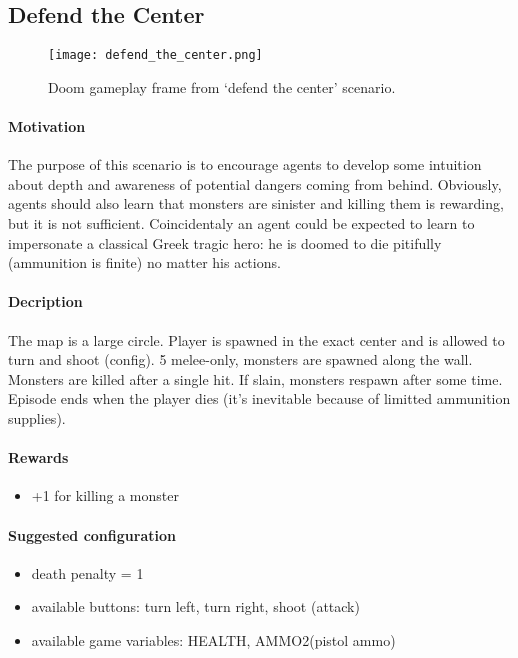 	\subsection{Defend the Center}\label{subsec:defend_the_center}
		\begin{figure}
			\centering
			\texttt{[image: defend\_the\_center.png]}
			\caption{Doom gameplay frame from `defend the center' scenario.}\label{fig:defend_the_center}
		\end{figure}
		\paragraph{Motivation} 
			The purpose of this scenario is to encourage agents to develop some intuition about depth and awareness of potential dangers coming from behind. Obviously, agents should also learn that monsters are sinister and killing them is rewarding, but it is not sufficient. Coincidentaly an agent could be expected to learn to impersonate a classical Greek tragic hero: he is doomed to die pitifully (ammunition is finite) no matter his actions.

		\paragraph{Decription}
			The map is a large circle. Player is spawned in the exact center and is allowed to turn and shoot (config). 5 melee-only, monsters are spawned along the wall. Monsters are killed after a single hit. If slain, monsters respawn after some time. Episode ends when the player dies (it's inevitable because of limitted ammunition supplies).

		\paragraph{Rewards}
			\begin{itemize}
				\item +1 for killing a monster
			\end{itemize}
		
		\paragraph{Suggested configuration}
			\begin{itemize}
				\item death penalty = 1
				\item available buttons: turn left, turn right, shoot (attack)
				\item available game variables: HEALTH, AMMO2(pistol ammo)
			\end{itemize}
	\newpage


